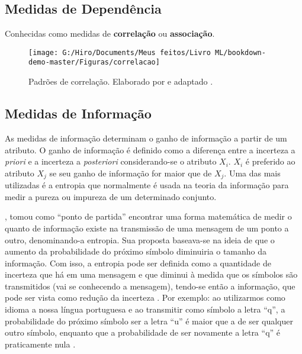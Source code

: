 \documentclass[
]{book}
\begin{document}
\hypertarget{medidasdep}{%
\subsection{Medidas de Dependência}\label{medidasdep}}

Conhecidas como medidas de \textbf{correlação} ou \textbf{associação}.

\begin{figure}

{\centering \texttt{[image: G:/Hiro/Documents/Meus feitos/Livro ML/bookdown-demo-master/Figuras/correlacao]} 

}

\caption{Padrões de correlação. Elaborado por \citet{gujarati2011econometria} e adaptado \citet{theil1978}.}\label{fig:correlacao}
\end{figure}



\hypertarget{medinfo}{%
\subsection{Medidas de Informação}\label{medinfo}}

As medidas de informação determinam o ganho de informação a partir de um atributo. O ganho de informação é definido como a diferença entre a incerteza a \emph{priori} e a incerteza a \emph{posteriori} considerando-se o atributo \(X_i\). \(X_i\) é preferido ao atributo \(X_j\) se seu ganho de informação for maior que de \(X_j\). Uma das mais utilizadas é a entropia que normalmente é usada na teoria da informação para medir a pureza ou impureza de um determinado conjunto.

\citet{shannon1948mathematical}, tomou como ``ponto de partida'' encontrar uma forma matemática de medir o quanto de informação existe na transmissão de uma mensagem de um ponto a outro, denominando-a entropia. Sua proposta baseava-se na ideia de que o aumento da probabilidade do próximo símbolo diminuiria o tamanho da informação. Com isso, a entropia pode ser definida como a quantidade de incerteza que há em uma mensagem e que diminui à medida que os símbolos são transmitidos (vai se conhecendo a mensagem), tendo-se então a informação, que pode ser vista como redução da incerteza \citep{shannon1948mathematical, paviotti2019consideraccoes}. Por exemplo: ao utilizarmos como idioma a nossa língua portuguesa e ao transmitir como símbolo a letra ``q'', a probabilidade do próximo símbolo ser a letra ``u'' é maior que a de ser qualquer outro símbolo, enquanto que a probabilidade de ser novamente a letra ``q'' é praticamente nula \citep{paviotti2019consideraccoes}.
\end{document}
